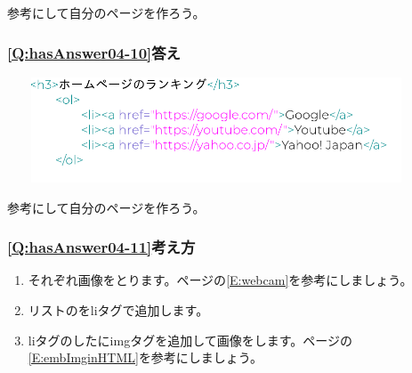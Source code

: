 \documentclass[a4paper,12pt]{jarticle}
\begin{document}
\bigskip

参考にして自分のページを作ろう。


\bigskip

\subsubsection{\bfseries
\ref*{Q:hasAnswer04-10}答え}


\centering
\includegraphics[width=12.448cm,height=3.129cm]{textbook-img241.png}
\flushleft

\bigskip

\centering
{}
\flushleft

\bigskip
参考にして自分のページを作ろう。

\clearpage\subsubsection{\bfseries
\ref*{Q:hasAnswer04-11}考え方}

\begin{enumerate}
  \item
        それぞれ画像をとります。\pageref*{E:webcam}ページの\ref*{E:webcam}を参考にしましょう。
  \item リストのをliタグで追加します。
  \item
        liタグのしたにimgタグを追加して画像をします。\pageref*{E:embImginHTML}ページの\ref*{E:embImginHTML}を参考にしましょう。
\end{enumerate}
\centering
{}
\flushleft
\end{document}
